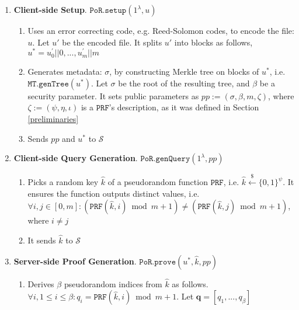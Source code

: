 \begin{enumerate}

\item\textbf{Client-side Setup}. $\mathtt{PoR.setup}(1^{\lambda},u)$  
\begin{enumerate}
\item Uses an error correcting code, e.g. Reed-Solomon codes, to encode  the file: $u$. Let $u'$ be the encoded file. It splits $u'$  into  blocks as follows, $u^{\scriptscriptstyle *}=u^{\scriptscriptstyle '}_{\scriptscriptstyle 0}||0,...,u^{\scriptscriptstyle '}_{\scriptscriptstyle m}||m$
\item Generates  metadata: $\sigma$, by constructing Merkle tree on blocks of $u^{\scriptscriptstyle *}$, i.e. $\mathtt{MT.genTree}(u^{\scriptscriptstyle *})$. Let $\sigma$ be the root of the resulting tree, and $\beta$ be a security parameter. It sets public  parameters as $pp:= (\sigma,\beta,m,\zeta)$, where $\zeta:=(\psi,\eta, \iota)$ is a $\mathtt{PRF}$'s description, as it was defined in Section \ref{preliminaries}
\item Sends $pp$ and $u^{\scriptscriptstyle *}$ to $\mathcal{S}$
\end{enumerate}

\item\textbf{Client-side Query Generation}. $\mathtt{PoR.genQuery}(1^{\scriptscriptstyle\lambda}, pp)$ 
\begin{enumerate}
\item\label{key-chalenge} Picks a random key $\hat{k}$ of a pseudorandom function $\mathtt{PRF}$, i.e. $\hat{k}\stackrel{\scriptscriptstyle\$}\leftarrow\{0,1\}^{\scriptscriptstyle\psi}$. It ensures the function outputs distinct values, i.e. $\forall i,j\in [0,m]: (\mathtt{PRF}(\hat{k},i)\bmod m+1)\neq(\mathtt{PRF}(\hat{k},j)\bmod m+1)$, where $i\neq j$

\item It sends $\hat{k}$ to $\mathcal{S}$
 
 \end{enumerate}
\item\label{PoR-server-prove}\textbf{Server-side Proof Generation}. $\mathtt{PoR.prove}(u^{\scriptscriptstyle *},\hat{k},pp)$ 
 \begin{enumerate}
\item Derives $\beta$ pseudorandom indices from $\hat{k}$ as follows. $\forall i,1\leq i\leq \beta: q_{\scriptscriptstyle i}=\mathtt{PRF}(\hat{k},i)\bmod m+1$. Let ${\bm{q}}=[q_{\scriptscriptstyle 1},..., q_{\scriptscriptstyle \beta}]$


\end{enumerate}
\end{enumerate}
